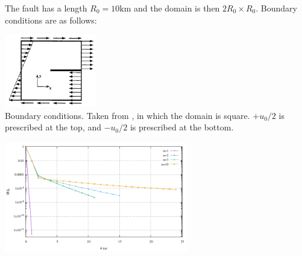 The fault has a length $R_0=10\si{\kilo\metre}$ and the domain is then $2R_0 \times R_0$. 
Boundary conditions are as follows:

\begin{center}
\includegraphics[width=4cm]{python_codes/fieldstone_87/images/baho92}\\
{\captionfont Boundary conditions. Taken from \cite{baho92}, in which the domain is square.
$+u_0/2$ is prescribed at the top, and $-u_0/2$ is prescribed at the bottom.
}
\end{center}




\begin{center}
\includegraphics[width=8cm]{python_codes/fieldstone_87/results/experiment_07/conv.pdf}
\end{center}


